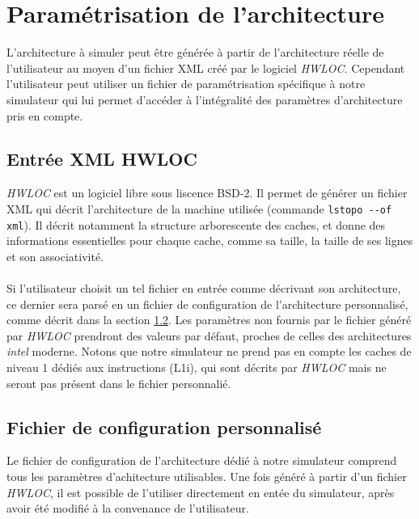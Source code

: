 \section{Paramétrisation de l'architecture}

L'architecture à simuler peut être générée à partir de l'architecture réelle de l'utilisateur au moyen d'un fichier XML créé par le logiciel \emph{HWLOC}. Cependant l'utilisateur peut utiliser un fichier de paramétrisation spécifique à notre simulateur qui lui permet d'accéder à l'intégralité des paramètres d'architecture pris en compte.

\subsection{Entrée XML HWLOC}

\emph{HWLOC} est un logiciel libre sous liscence BSD-2. Il permet de générer un fichier XML qui décrit l'architecture de la machine utilisée (commande \verb?lstopo --of xml?). Il décrit notamment la structure arborescente des caches, et donne des informations essentielles pour chaque cache, comme sa taille, la taille de ses lignes et son associativité. 

\paragraph{}
Si l'utilisateur choisit un tel fichier en entrée comme décrivant son architecture, ce dernier sera parsé en un fichier de configuration de l'architecture personnalisé, comme décrit dans la section \ref{config}. Les paramètres non fournis par le fichier généré par \emph{HWLOC} prendront des valeurs par défaut, proches de celles des architectures \emph{intel} moderne. Notons que notre simulateur ne prend pas en compte les caches de niveau 1 dédiés aux instructions (L1i), qui sont décrits par \emph{HWLOC} mais ne seront pas présent dans le fichier personnalié.

\subsection{Fichier de configuration personnalisé}
\label{config}
Le fichier de configuration de l'architecture dédié à notre simulateur comprend tous les paramètres d'achitecture utilisables. Une fois généré à partir d'un fichier \emph{HWLOC}, il est possible de l'utiliser directement en entée du simulateur, après avoir été modifié à la convenance de l'utilisateur.

